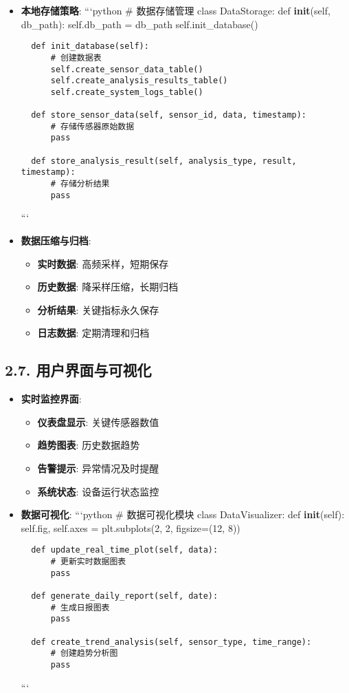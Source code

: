 \begin{itemize}
\item
  \textbf{本地存储策略}: ```python \# 数据存储管理 class DataStorage:
  def \textbf{init}(self, db\_path): self.db\_path = db\_path
  self.init\_database()

\begin{lstlisting}
  def init_database(self):
      # 创建数据表
      self.create_sensor_data_table()
      self.create_analysis_results_table()
      self.create_system_logs_table()

  def store_sensor_data(self, sensor_id, data, timestamp):
      # 存储传感器原始数据
      pass

  def store_analysis_result(self, analysis_type, result, timestamp):
      # 存储分析结果
      pass
\end{lstlisting}

  ```
\item
  \textbf{数据压缩与归档}:

  \begin{itemize}
  \tightlist
  \item
    \textbf{实时数据}: 高频采样，短期保存
  \item
    \textbf{历史数据}: 降采样压缩，长期归档
  \item
    \textbf{分析结果}: 关键指标永久保存
  \item
    \textbf{日志数据}: 定期清理和归档
  \end{itemize}
\end{itemize}

\subsection{2.7.
用户界面与可视化}\label{ux7528ux6237ux754cux9762ux4e0eux53efux89c6ux5316}

\begin{itemize}
\item
  \textbf{实时监控界面}:

  \begin{itemize}
  \tightlist
  \item
    \textbf{仪表盘显示}: 关键传感器数值
  \item
    \textbf{趋势图表}: 历史数据趋势
  \item
    \textbf{告警提示}: 异常情况及时提醒
  \item
    \textbf{系统状态}: 设备运行状态监控
  \end{itemize}
\item
  \textbf{数据可视化}: ```python \# 数据可视化模块 class DataVisualizer:
  def \textbf{init}(self): self.fig, self.axes = plt.subplots(2, 2,
  figsize=(12, 8))

\begin{lstlisting}
  def update_real_time_plot(self, data):
      # 更新实时数据图表
      pass

  def generate_daily_report(self, date):
      # 生成日报图表
      pass

  def create_trend_analysis(self, sensor_type, time_range):
      # 创建趋势分析图
      pass
\end{lstlisting}

  ```
\end{itemize}

